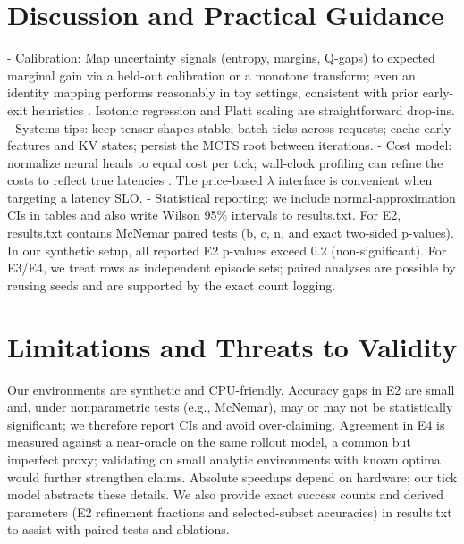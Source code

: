 \section{Discussion and Practical Guidance}
\label{sec:guidance}
- Calibration: Map uncertainty signals (entropy, margins, Q-gaps) to expected marginal gain via a held-out calibration or a monotone transform; even an identity mapping performs reasonably in toy settings, consistent with prior early-exit heuristics \cite{Kaya2019ShallowDeep,Guo2017Calibration,NiculescuMizil2005Calib}. Isotonic regression and Platt scaling \cite{Platt1999} are straightforward drop-ins.
- Systems tips: keep tensor shapes stable; batch ticks across requests; cache early features and KV states; persist the MCTS root between iterations.
- Cost model: normalize neural heads to equal cost per tick; wall-clock profiling can refine the costs to reflect true latencies \cite{Huang2018MSDNet,Wang2018SkipNet,Figurnov2017SACT,Bolukbasi2017Adaptive}. The price-based $\lambda$ interface is convenient when targeting a latency SLO.
- Statistical reporting: we include normal-approximation CIs in tables and also write Wilson 95\% intervals to results.txt. For E2, results.txt contains McNemar paired tests (b, c, n, and exact two-sided p-values). In our synthetic setup, all reported E2 p-values exceed 0.2 (non-significant). For E3/E4, we treat rows as independent episode sets; paired analyses are possible by reusing seeds and are supported by the exact count logging.

\section{Limitations and Threats to Validity}
Our environments are synthetic and CPU-friendly. Accuracy gaps in E2 are small and, under nonparametric tests (e.g., McNemar), may or may not be statistically significant; we therefore report CIs and avoid over-claiming. Agreement in E4 is measured against a near-oracle on the same rollout model, a common but imperfect proxy; validating on small analytic environments with known optima would further strengthen claims. Absolute speedups depend on hardware; our tick model abstracts these details. We also provide exact success counts and derived parameters (E2 refinement fractions and selected-subset accuracies) in results.txt to assist with paired tests and ablations.

